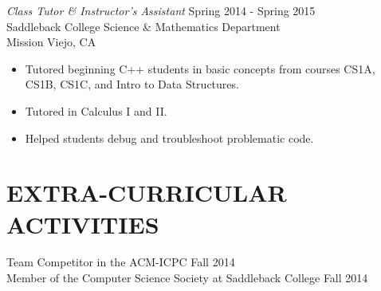 \documentclass[margin, 10pt]{res} %
\begin{document}
\begin{resume}
{\sl Class Tutor \& Instructor's Assistant} \hfill Spring 2014 - Spring 2015 \\
Saddleback College Science \& Mathematics Department \\
Mission Viejo, CA

\begin{itemize} \itemsep -2pt %
\item Tutored beginning C++ students in basic concepts from courses \newline
CS1A, CS1B, CS1C, and Intro to Data Structures.
\item Tutored in Calculus I and II.
\item Helped students debug and troubleshoot problematic code.
\end{itemize}


\section{EXTRA-CURRICULAR \\ ACTIVITIES} 

Team Competitor in the ACM-ICPC \hfill Fall 2014 \\
Member of the Computer Science Society at Saddleback College \hfill Fall 2014


\end{resume}
\end{document}
